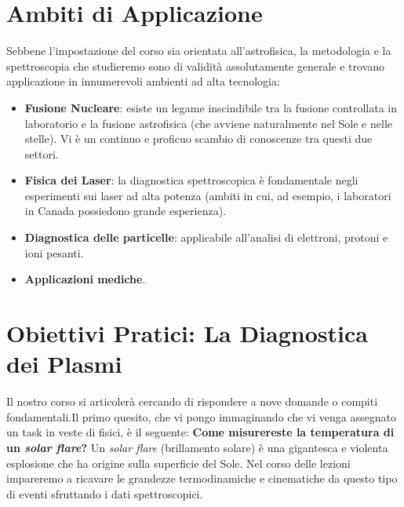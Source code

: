 \section{Ambiti di Applicazione}
Sebbene l'impostazione del corso sia orientata all'astrofisica, la metodologia e la spettroscopia che studieremo sono di validità assolutamente generale e trovano applicazione in innumerevoli ambienti ad alta tecnologia:\begin{itemize}\item \textbf{Fusione Nucleare}: esiste un legame inscindibile tra la fusione controllata in laboratorio e la fusione astrofisica (che avviene naturalmente nel Sole e nelle stelle). Vi è un continuo e proficuo scambio di conoscenze tra questi due settori.\item \textbf{Fisica dei Laser}: la diagnostica spettroscopica è fondamentale negli esperimenti sui laser ad alta potenza (ambiti in cui, ad esempio, i laboratori in Canada possiedono grande esperienza).\item \textbf{Diagnostica delle particelle}: applicabile all'analisi di elettroni, protoni e ioni pesanti.\item \textbf{Applicazioni mediche}.\end{itemize}

\section{Obiettivi Pratici: La Diagnostica dei Plasmi}
Il nostro corso si articolerà cercando di rispondere a nove domande o compiti fondamentali.Il primo quesito, che vi pongo immaginando che vi venga assegnato un task in veste di fisici, è il seguente: \textbf{Come misurereste la temperatura di un \textit{solar flare}?} Un \textit{solar flare} (brillamento solare) è una gigantesca e violenta esplosione che ha origine sulla superficie del Sole. Nel corso delle lezioni impareremo a ricavare le grandezze termodinamiche e cinematiche da questo tipo di eventi sfruttando i dati spettroscopici.

